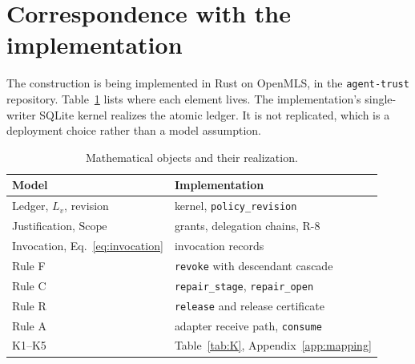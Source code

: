 \documentclass[aps,prx,reprint,superscriptaddress,nofootinbib,floatfix]{revtex4-2}
\theoremstyle{remark}
\newcommand{\Live}{L}                     %
\newcommand{\Static}{\mathrm{Scope}}
\begin{document}
\section{Correspondence with the implementation}\label{sec:implementation}

The construction is being implemented in Rust on OpenMLS, in the \texttt{agent-trust} repository. Table~\ref{tab:impl} lists where each element lives. The implementation's single-writer SQLite kernel realizes the atomic ledger. It is not replicated, which is a deployment choice rather than a model assumption.

\begin{table}[t]
\caption{Mathematical objects and their realization.}
\label{tab:impl}
\begin{ruledtabular}
\begin{tabular}{ll}
Model & Implementation\\
\hline
Ledger, $\Live_v$, revision & kernel, \texttt{policy\_revision}\\
Justification, $\Static$ & grants, delegation chains, R-8\\
Invocation, Eq.~\eqref{eq:invocation} & invocation records\\
Rule F & \texttt{revoke} with descendant cascade\\
Rule C & \texttt{repair\_stage}, \texttt{repair\_open}\\
Rule R & \texttt{release} and release certificate\\
Rule A & adapter receive path, \texttt{consume}\\
K1--K5 & Table~\ref{tab:K}, Appendix~\ref{app:mapping}\\
\end{tabular}
\end{ruledtabular}
\end{table}
\end{document}
